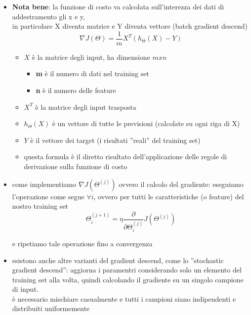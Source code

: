 \documentclass[10pt,oneside,a4paper]{article}
\begin{document}
\begin{itemize}
\item  \textbf{Nota bene}: la funzione di costo va calcolata sull'interezza dei dati di addestramento gli x e y, \\
in particolare X diventa matrice e Y diventa vettore (batch gradient descend)
$$\nabla J(\Theta)=\frac{1}{m}X^{T}(h_{\Theta}(X)-Y)$$
 \begin{itemize}
\item $X$ è la matrice degli input, ha dimensione $mxn$
\begin{itemize}
\item \textbf{m}  è il numero di dati  nel training set
\item \textbf{n} è il numero delle feature
\end{itemize}
\item $X^{T}$ è la matrice degli input trasposta
\item $h_{\Theta}(X)$ è un vettore di tutte le previsioni (calcolate su ogni riga di X)
\item $Y$ è il vettore dei target (i risultati ''reali'' del training set)
\item questa formula è il diretto risultato dell'applicazione delle regole di derivazione sulla funzione di costo

\end{itemize}
\item come implementiamo $\nabla J(\Theta^{(j)})$ ovvero il calcolo del gradiente:
eseguiamo l'operazione come segue $\forall i$, ovvero per tutti le caratteristiche (o feature) del nostro training set
$$\Theta^{(j+1)}_{i}=\eta \frac{\partial}{\partial \Theta^{(j)}_{i}} J(\Theta^{(j)})$$
 
e ripetiamo tale operazione fino a convergenza

\item esistono anche altre varianti del gradient descend, come lo ''stochastic gradient descend'':
aggiorna i paramentri considerando solo un elemento del training set alla volta, quindi calcolando il gradiente su un singolo campione di input. \\
è necessario mischiare casualmente e tutti i campioni siano indipendenti e distribuiti uniformemente

\end{itemize}
\end{document}
